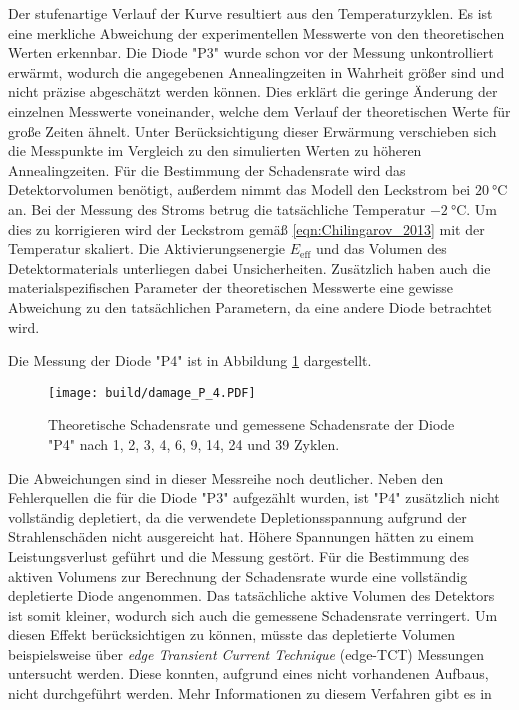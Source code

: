 Der stufenartige Verlauf der Kurve resultiert aus den Temperaturzyklen.
Es ist eine merkliche Abweichung der experimentellen Messwerte von den theoretischen
Werten erkennbar. Die Diode "P3" wurde schon vor der Messung unkontrolliert erwärmt, wodurch
die angegebenen Annealingzeiten in Wahrheit größer sind und nicht präzise abgeschätzt werden können. Dies erklärt die
geringe Änderung der einzelnen Messwerte voneinander, welche dem
Verlauf der theoretischen Werte für große Zeiten ähnelt.
Unter Berücksichtigung dieser Erwärmung verschieben sich die Messpunkte im Vergleich zu den
simulierten Werten zu höheren Annealingzeiten.
Für die Bestimmung der Schadensrate
wird das Detektorvolumen benötigt, außerdem nimmt das Modell den Leckstrom bei $\SI{20}{\celsius}$ an.
Bei der Messung des Stroms betrug die tatsächliche Temperatur
$\SI{-2}{\celsius}$. Um dies zu korrigieren wird der Leckstrom gemäß \ref{eqn:Chilingarov_2013}
mit der Temperatur skaliert. Die Aktivierungsenergie $E_{\mathrm{eff}}$ und das Volumen des Detektormaterials
unterliegen dabei Unsicherheiten. Zusätzlich haben auch die materialspezifischen Parameter
der theoretischen Messwerte eine gewisse Abweichung zu den tatsächlichen Parametern, da
eine andere Diode betrachtet wird.

Die Messung der Diode "P4" ist in Abbildung \ref{fig:P_4}
dargestellt.

\begin{figure}
  \centering
    \texttt{[image: build/damage\_P\_4.PDF]}
\caption{Theoretische Schadensrate und gemessene Schadensrate
der Diode "P4" nach 1, 2, 3, 4, 6, 9, 14, 24 und 39 Zyklen.}
\label{fig:P_4}
\end{figure}

Die Abweichungen sind in dieser Messreihe noch deutlicher. Neben den Fehlerquellen die
für die Diode "P3" aufgezählt wurden, ist "P4" zusätzlich nicht vollständig depletiert, da die verwendete
Depletionsspannung aufgrund der Strahlenschäden nicht ausgereicht hat. Höhere Spannungen hätten zu
einem Leistungsverlust geführt und die Messung gestört.
Für die Bestimmung des aktiven Volumens zur Berechnung der Schadensrate wurde eine vollständig
depletierte Diode angenommen. Das tatsächliche aktive Volumen des Detektors ist somit kleiner, wodurch sich auch
die gemessene Schadensrate verringert.
Um diesen Effekt berücksichtigen zu können, müsste das depletierte Volumen
beispielsweise über \textit{edge Transient Current Technique} (edge-TCT) Messungen untersucht werden.
Diese konnten, aufgrund eines nicht vorhandenen Aufbaus, nicht durchgeführt werden.
Mehr Informationen zu diesem Verfahren gibt es in \cite{edge}
